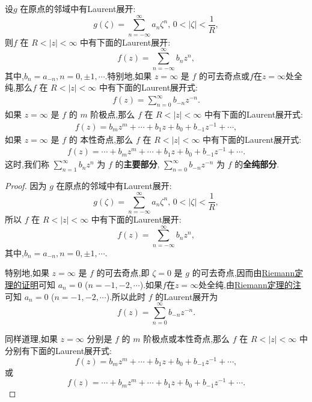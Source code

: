 \documentclass[../../main.tex]{subfiles}
\begin{document}
\begin{proposition}\label{proposition:无穷远点为孤立奇点时的Laurent展开}
设\( g \) 在原点的邻域中有Laurent展开:
\[
g(\zeta) = \sum_{n = -\infty}^{\infty} a_n \zeta^n, \, 0 < |\zeta| < \frac{1}{R},
\]
则\( f \) 在 \( R < |z| < \infty \) 中有下面的Laurent展开:
\[
f(z) = \sum_{n = -\infty}^{\infty} b_n z^n,
\]
其中,\( b_n = a_{-n}, n = 0, \pm 1, \cdots \).特别地,如果 \( z = \infty \) 是 \( f \) 的可去奇点或$f$在$z=\infty$处全纯,那么\( f \) 在 \( R < |z| < \infty \) 中有下面的Laurent展开式:
\begin{align}\label{eq:::--1232-3}
f(z) = \sum_{n = 0}^{\infty} b_{-n} z^{-n}.
\end{align}
如果 \( z = \infty \) 是 \( f \) 的 \( m \) 阶极点,那么 \( f \) 在 \( R < |z| < \infty \) 中有下面的Laurent展开式:
\begin{align}\label{eq:::--1232-4}
f(z) = b_m z^m + \cdots + b_1 z + b_0 + b_{-1} z^{-1} + \cdots,
\end{align}
如果 \( z = \infty \) 是 \( f \) 的 本性奇点,那么 \( f \) 在 \( R < |z| < \infty \) 中有下面的Laurent展开式:
\begin{align}\label{eq:::--1232-5}
f(z) = \cdots + b_m z^m + \cdots + b_1 z + b_0 + b_{-1} z^{-1} + \cdots.
\end{align}
这时,我们称 \( \sum_{n = 1}^{\infty} b_n z^n \) 为 \( f \) 的\textbf{主要部分}, \( \sum_{n = 0}^{\infty} b_{-n} z^{-n} \) 为 \( f \) 的\textbf{全纯部分}.
\end{proposition}
\begin{proof}
因为 \( g \) 在原点的邻域中有Laurent展开:
\[
g(\zeta) = \sum_{n = -\infty}^{\infty} a_n \zeta^n, \, 0 < |\zeta| < \frac{1}{R},
\]
所以 \( f \) 在 \( R < |z| < \infty \) 中有下面的Laurent展开:
\[
f(z) = \sum_{n = -\infty}^{\infty} b_n z^n,
\]
其中,\( b_n = a_{-n}, n = 0, \pm 1, \cdots \).

特别地,如果 \( z = \infty \) 是 \( f \) 的可去奇点,即 \( \zeta = 0 \) 是 \( g \) 的可去奇点,因而由\hyperref[theorem:Riemann定理-定理5.2.1]{Riemann定理的证明}可知 \( a_n = 0 \) (\( n = -1, -2, \cdots \)).如果$f$在$z=\infty$处全纯,由\hyperref[theorem:Riemann定理-定理5.2.1]{Riemann定理的注}可知 \( a_n = 0 \) (\( n = -1, -2, \cdots \)).所以此时 \( f \) 的Laurent展开为
\[
f(z) = \sum_{n = 0}^{\infty} b_{-n} z^{-n}.
\]

同样道理,如果 \( z = \infty \) 分别是 \( f \) 的 \( m \) 阶极点或本性奇点,那么 \( f \) 在 \( R < |z| < \infty \) 中分别有下面的Laurent展开式:
\[
f(z) = b_m z^m + \cdots + b_1 z + b_0 + b_{-1} z^{-1} + \cdots, 
\]
或
\[
f(z) = \cdots + b_m z^m + \cdots + b_1 z + b_0 + b_{-1} z^{-1} + \cdots. 
\]

\end{proof}
\end{document}
